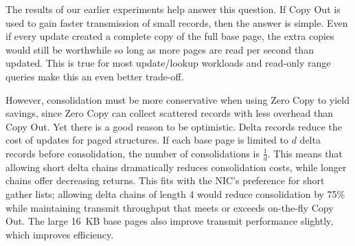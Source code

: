 


The results of our earlier experiments help answer this question.  If Copy Out
is used to gain faster transmission of small records, then the answer is
simple. Even if every update created a complete copy of the full base page, the
extra copies would still be worthwhile so long as more pages are read per
second than updated. This is true for most update/lookup workloads and read-only
range queries make this an even better trade-off.

However, consolidation must be more conservative when using Zero Copy to yield
savings, since Zero Copy can collect scattered records with less overhead than
Copy Out. Yet there is a good reason to be optimistic.  Delta records
reduce the cost of updates for paged structures. If each base page is limited
to $d$ delta records before consolidation, the number of consolidations is
$\frac{1}{d}$. This means that allowing short delta chains dramatically reduces
consolidation costs, while longer chains offer decreasing returns. This fits with
the NIC's preference for short gather lists; allowing delta chains of length 4
would reduce consolidation by 75\% while maintaining transmit throughput that
meets or exceeds on-the-fly Copy Out.  The large 16~KB base pages also
improve transmit performance slightly, which improves efficiency.


